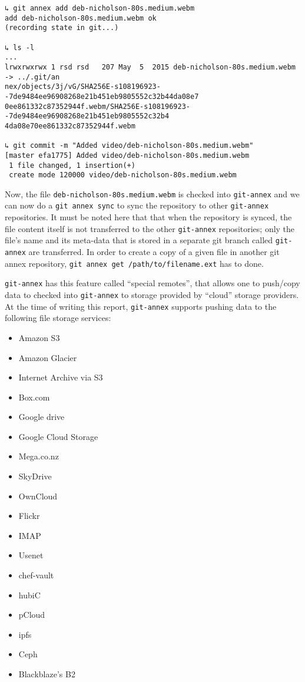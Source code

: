 {\small
\begin{verbatim}
↳ git annex add deb-nicholson-80s.medium.webm
add deb-nicholson-80s.medium.webm ok
(recording state in git...)

↳ ls -l
...
lrwxrwxrwx 1 rsd rsd   207 May  5  2015 deb-nicholson-80s.medium.webm -> ../.git/an
nex/objects/3j/vG/SHA256E-s108196923--7de9484ee96908268e21b451eb9805552c32b44da08e7
0ee861332c87352944f.webm/SHA256E-s108196923--7de9484ee96908268e21b451eb9805552c32b4
4da08e70ee861332c87352944f.webm

↳ git commit -m "Added video/deb-nicholson-80s.medium.webm"
[master efa1775] Added video/deb-nicholson-80s.medium.webm
 1 file changed, 1 insertion(+)
 create mode 120000 video/deb-nicholson-80s.medium.webm
\end{verbatim}
}

Now, the file \verb+deb-nicholson-80s.medium.webm+ is checked into
\verb+git-annex+ and we can now do a \verb+git annex sync+ to sync the
repository to other \verb+git-annex+ repositories. It must be noted
here that that when the repository is synced, the file content itself
is not transferred to the other \verb+git-annex+ repositories; only
the file's name and its meta-data that is stored in a separate git
branch called \verb+git-annex+ are
transferred\cite{documentation:git-annex-hworks}. In order to create a
copy of a given file in another git annex repository,
\verb+git annex get /path/to/filename.ext+ has to done.

\verb+git-annex+ has this feature called ``special
remotes''\cite{documentation:git-annex-sremotes}, that allows one to
push/copy data to checked into \verb+git-annex+ to storage provided by
``cloud'' storage providers. At the time of writing this report,
\verb+git-annex+ supports pushing data to the following file storage
services:

{\scriptsize
\begin{itemize}
\item Amazon S3
\item Amazon Glacier
\item Internet Archive via S3
\item Box.com
\item Google drive
\item Google Cloud Storage
\item Mega.co.nz
\item SkyDrive
\item OwnCloud
\item Flickr
\item IMAP
\item Usenet
\item chef-vault
\item hubiC
\item pCloud
\item ipfs
\item Ceph
\item Blackblaze's B2
\end{itemize}
}

